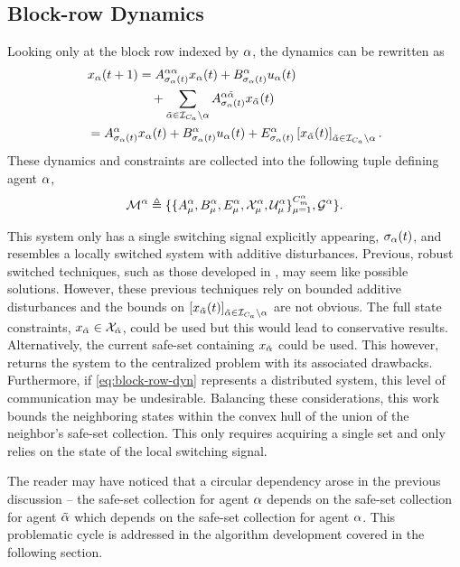 \subsection{Block-row Dynamics}
Looking only at the block row indexed by $\alpha$, the dynamics can be rewritten as 
\begin{align}\label{eq:block-row-dyn}
x_\agentidx(t+1)&=A^{\agentidx\agentidx}_{\ss_\agentidx(t)}x_\agentidx(t)+B^\agentidx_{\ss_\agentidx(t)}u_\agentidx(t)\nonumber\\&\quad+\sum_{\tilde\agentidx\in\idxset{\numagents}\setminus \agentidx}A^{\agentidx\tilde\agentidx}_{\ss_\agentidx(t)}x_{\tilde\agentidx}(t)\\
=A^{\agentidx}_{\ss_\agentidx(t)}&x_\agentidx(t)+B^\agentidx_{\ss_\agentidx(t)}u_\agentidx(t)+E^\agentidx_{\ss_\agentidx(t)}\left[x_{\tilde\agentidx}(t)\right]_{\tilde\agentidx\in\idxset{\numagents}\setminus \agentidx}.
\end{align}
These dynamics and constraints are collected into the following tuple defining agent $\alpha$,
$$\agent{\agentidx}\triangleq\{\{A^{\agentidx}_{\modeidx},B^\agentidx_{\modeidx},E^\agentidx_{\modeidx},\xcon[\modeidx]^\agentidx,\ucon[\modeidx]^\agentidx\}_{\modeidx=1}^{\nummodes[\agentidx]},\graph^\agentidx\}.$$

This system only has a single switching signal explicitly appearing, ${\sigma}_{\alpha}(t)$, and resembles a locally switched system with additive disturbances. Previous, robust switched techniques, such as those developed in \cite{Lavaei2021}, may seem like possible solutions. However, these previous techniques rely on bounded additive disturbances and the bounds on $\left[x_{\tilde{\alpha}}(t)\right]_{\tilde{\alpha}\in\mathcal{I}_{{C_a}}\setminus \alpha}$ are not obvious. The full state constraints, $x_{\tilde{\agentidx}}\in\xcon[\tilde{\agentidx}]$, could be used but this would lead to conservative results. Alternatively, the current safe-set containing $x_{\tilde{\alpha}}$ could be used. This however, returns the system to the centralized problem with its associated drawbacks. Furthermore, if \autoref{eq:block-row-dyn} represents a distributed system, this level of communication may be undesirable. Balancing these considerations, this work bounds the neighboring states within the convex hull of the union of the neighbor's safe-set collection. This only requires acquiring a single set and only relies on the state of the local switching signal. 

The reader may have noticed that a circular dependency arose in the previous discussion -- the safe-set collection for agent $\alpha$ depends on the safe-set collection for agent ${\tilde{\alpha}}$ which depends on the safe-set collection for agent $\alpha$. This problematic cycle is addressed in the algorithm development covered in the following section. 